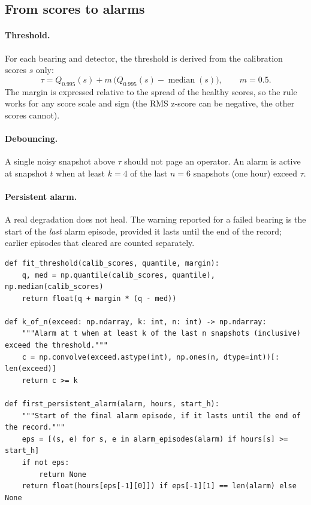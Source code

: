 \documentclass[11pt]{article}
\begin{document}
\subsection{From scores to alarms}
\paragraph{Threshold.} For each bearing and detector, the threshold is derived from the calibration
scores $s$ only:
\begin{equation}
\tau = Q_{0.995}(s) + m\,\bigl(Q_{0.995}(s) - \operatorname{median}(s)\bigr), \qquad m = 0.5.
\end{equation}
The margin is expressed relative to the spread of the healthy scores, so the rule works for any score
scale and sign (the RMS z-score can be negative, the other scores cannot).

\paragraph{Debouncing.} A single noisy snapshot above $\tau$ should not page an operator. An alarm is
active at snapshot $t$ when at least $k=4$ of the last $n=6$ snapshots (one hour) exceed $\tau$.

\paragraph{Persistent alarm.} A real degradation does not heal. The warning reported for a failed
bearing is the start of the \emph{last} alarm episode, provided it lasts until the end of the record;
earlier episodes that cleared are counted separately.

\begin{lstlisting}[caption={Threshold, k-of-n debouncing and persistent alarm (\code{src/bearing\_efw/alarm.py}).},label=lst:alarm]
def fit_threshold(calib_scores, quantile, margin):
    q, med = np.quantile(calib_scores, quantile), np.median(calib_scores)
    return float(q + margin * (q - med))

def k_of_n(exceed: np.ndarray, k: int, n: int) -> np.ndarray:
    """Alarm at t when at least k of the last n snapshots (inclusive) exceed the threshold."""
    c = np.convolve(exceed.astype(int), np.ones(n, dtype=int))[: len(exceed)]
    return c >= k

def first_persistent_alarm(alarm, hours, start_h):
    """Start of the final alarm episode, if it lasts until the end of the record."""
    eps = [(s, e) for s, e in alarm_episodes(alarm) if hours[s] >= start_h]
    if not eps:
        return None
    return float(hours[eps[-1][0]]) if eps[-1][1] == len(alarm) else None
\end{lstlisting}
\end{document}
